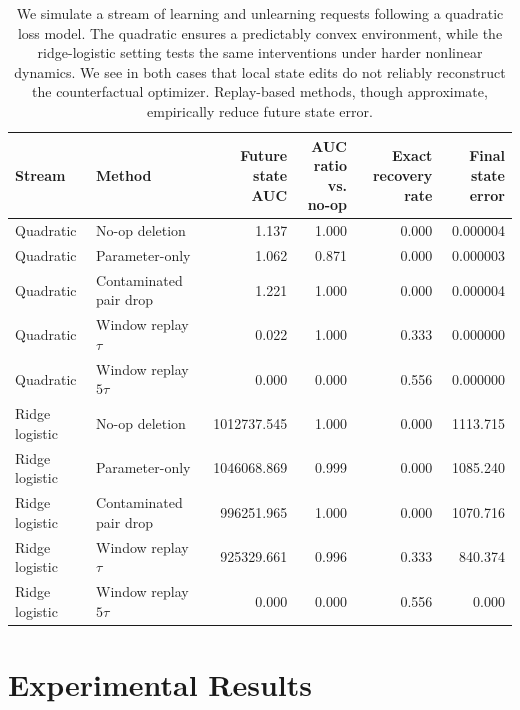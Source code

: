 \documentclass{ssl}
\begin{document}
\begin{landscape}
\begin{table}[t]
\centering
\caption{
We simulate a stream of learning and unlearning requests following a quadratic loss model.
The quadratic ensures a predictably convex environment, while the ridge-logistic setting tests the same interventions under harder nonlinear dynamics. 
We see in both cases that local state edits do not reliably reconstruct the counterfactual optimizer. Replay-based methods, though approximate, empirically reduce future state error. 
}
\label{tab:stream-type-stress-test}
\small
\begin{tabularx}{\textwidth}{llrrrr}
\toprule
Stream 
& Method 
& \makecell{Future\\state AUC}
& \makecell{AUC ratio\\vs. no-op}
& \makecell{Exact recovery\\rate}
& \makecell{Final\\state error} \\
\midrule
Quadratic 
& No-op deletion 
& 1.137 & 1.000 & 0.000 & 0.000004 \\
Quadratic 
& Parameter-only 
& 1.062 & 0.871 & 0.000 & 0.000003 \\
Quadratic 
& Contaminated pair drop 
& 1.221 & 1.000 & 0.000 & 0.000004 \\
Quadratic 
& Window replay $\tau$ 
& 0.022 & 1.000 & 0.333 & 0.000000 \\
Quadratic 
& Window replay $5\tau$ 
& 0.000 & 0.000 & 0.556 & 0.000000 \\
\midrule
Ridge logistic 
& No-op deletion 
& 1012737.545 & 1.000 & 0.000 & 1113.715 \\
Ridge logistic 
& Parameter-only 
& 1046068.869 & 0.999 & 0.000 & 1085.240 \\
Ridge logistic 
& Contaminated pair drop 
& 996251.965 & 1.000 & 0.000 & 1070.716 \\
Ridge logistic 
& Window replay $\tau$ 
& 925329.661 & 0.996 & 0.333 & 840.374 \\
Ridge logistic 
& Window replay $5\tau$ 
& 0.000 & 0.000 & 0.556 & 0.000 \\
\bottomrule
\end{tabularx}
\end{table}
\end{landscape}

\section{Experimental Results}
\end{document}

